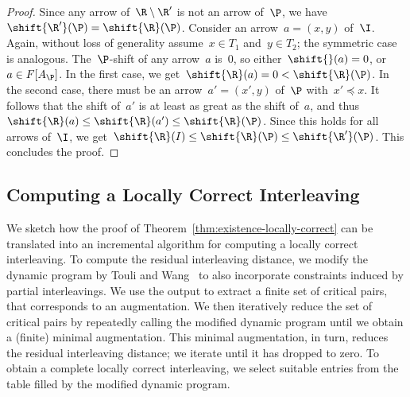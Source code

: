 \begin{proof}
    Since any arrow of~$\R \setminus \R'$ is not an arrow of~$\P$, we have~$\shift{\R'}(\P) = \shift{\R}(\P)$.
    Consider an arrow~$a = (x, y)$ of~$\I$.
    Again, without loss of generality assume~$x \in T_1$ and~$y \in T_2$; the symmetric case is analogous.
    The~$\P$-shift of any arrow~$a$ is~$0$, so either~$\shift{}(a) = 0$, or $a \in F[A_\P]$.
    In the first case, we get~$\shift{\R}(a) = 0 < \shift{\R}(\P)$.
    In the second case, there must be an arrow~$a' = (x',y)$ of~$\P$ with~$x' \preceq x$.
    It follows that the shift of~$a'$ is at least as great as the shift of~$a$, and thus~$\shift{\R}(a) \le \shift{\R}(a') \le \shift{\R}(\P)$.
    Since this holds for all arrows of~$\I$, we get~$\shift{\R}(I) \le \shift{\R}(\P) \le \shift{\R'}(\P)$.
    This concludes the proof.
\end{proof}
%
\subsection{Computing a Locally Correct Interleaving}\label{sec:computing}
We sketch how the proof of Theorem~\ref{thm:existence-locally-correct} can be translated into an incremental algorithm for computing a locally correct interleaving.
To compute the residual interleaving distance, we modify the dynamic program by Touli and Wang~\cite{touli2022fpt} to also incorporate constraints induced by partial interleavings.
We use the output to extract a finite set of critical pairs, that corresponds to an augmentation.
We then iteratively reduce the set of critical pairs by repeatedly calling the modified dynamic program until we obtain a (finite) minimal augmentation.
This minimal augmentation, in turn, reduces the residual interleaving distance; we iterate until it has dropped to zero.
To obtain a complete locally correct interleaving, we select suitable entries from the table filled by the modified dynamic program.
%
